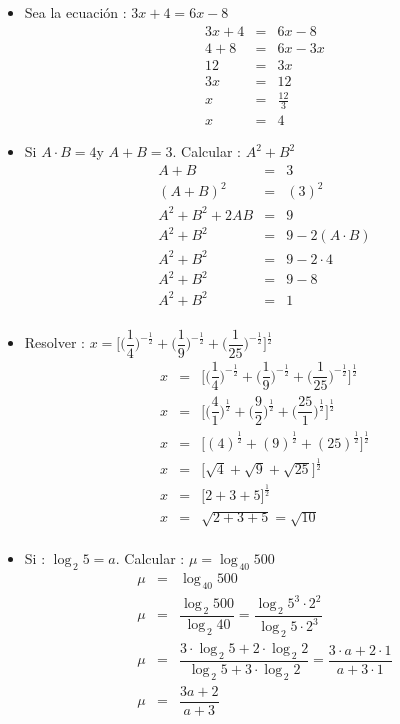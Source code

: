 \documentclass[11pt, twocolumn, landscape, a5paper]{article}
\begin{document}
\begin{itemize}
\item{Sea la ecuación : \quad$3x + 4 = 6x - 8$
\begin{eqnarray*} 
3x + 4 &=& 6x - 8 \\
4 + 8 &=& 6x - 3x \\
12 &=& 3x \\
3x &=& 12 \\
x &=& \frac{12}{3} \\
x &=& 4
\end{eqnarray*}} 
\item{Si \quad$A \cdot B = 4$\qquad y \quad$A + B = 3$. Calcular : \quad$A^2 + B^2$
\begin{eqnarray*}
A + B &=& 3 \\
(A + B)^2 &=& (3)^2 \\
A^{2} + B^{2} + 2AB &=& 9 \\
A^{2} + B^{2} &=& 9 - 2 (A \cdot B) \\
A^{2} + B^{2} &=& 9 - 2 \cdot 4 \\
A^{2} + B^{2} &=& 9 - 8 \\
A^{2} + B^{2} &=& 1 \\
\end{eqnarray*}}
\item{Resolver : \quad$x = \Big[\Big(\dfrac1{4}\Big)^{-\frac1{2}} + \Big(\dfrac1{9}\Big)^{-\frac1{2}} + \Big(\dfrac1{25}\Big)^{-\frac1{2}} \Big]^{\frac1{2}}$ 
\begin{eqnarray*}
x &=& \Big[\Big(\dfrac1{4}\Big)^{-\frac1{2}} + \Big(\dfrac1{9}\Big)^{-\frac1{2}} + \Big(\dfrac1{25}\Big)^{-\frac1{2}} \Big]^{\frac1{2}} \\
x &=& \Big[\Big(\dfrac{4}{1}\Big)^{\frac1{2}} + \Big(\dfrac{9}{2}\Big)^{\frac1{2}} + \Big(\dfrac{25}{1}\Big)^{\frac1{2}} \Big]^{\frac1{2}} \\
x &=& \Big[(4)^{\frac1{2}} + (9)^{\frac1{2}} + (25)^{\frac1{2}} \Big]^{\frac1{2}} \\
x &=& \Big[\sqrt{4} + \sqrt{9} + \sqrt{25}\Big]^{\frac1{2}} \\
x &=& \Big[2 + 3 + 5\Big]^{\frac1{2}} \\
x &=& \sqrt{2 + 3 + 5} = \sqrt{10}  \\
\end{eqnarray*} 
}
\item{Si : \quad$\log_{\,2}{5} = a$. Calcular : $\mu = \log_{\,40} 500$
\begin{eqnarray*}
\mu &=& \log_{\,40} 500 \\
\mu &=& \dfrac{\log_{\,2} 500}{\log_{\,2} 40} = \dfrac{\log_{\,2} 5^{3} \cdot 2^{2} }{\log_{\,2} 5 \cdot 2^{3}} \\
\mu &=& \dfrac{3\cdot \log_{\,2} 5 + 2 \cdot \log_{\,2} 2}{\log_{\,2} 5 + 3 \cdot \log_{\,2} 2} = \dfrac{3 \cdot a + 2 \cdot 1}{a + 3 \cdot 1} \\
\mu &=& \dfrac{3a + 2}{a + 3}
\end{eqnarray*}
}
\end{itemize}
\end{document}
